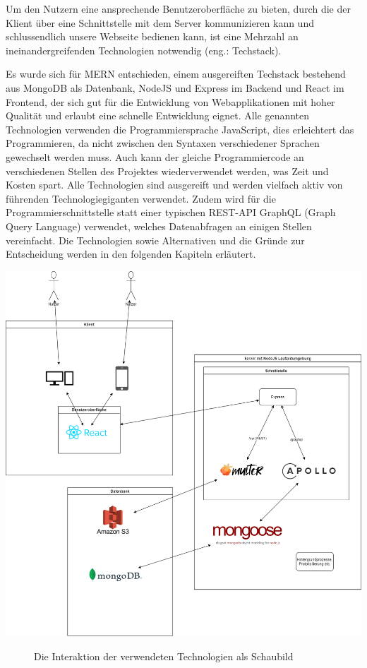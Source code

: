 Um den Nutzern eine ansprechende Benutzeroberfläche zu bieten, durch die der Klient über eine Schnittstelle mit dem Server kommunizieren kann und schlussendlich unsere Webseite bedienen kann, ist eine Mehrzahl an ineinandergreifenden Technologien notwendig (eng.: Techstack).

Es wurde sich für MERN entschieden, einem ausgereiften Techstack bestehend aus MongoDB als Datenbank, NodeJS und Express im Backend und React im Frontend, der sich gut für die Entwicklung von Webapplikationen mit hoher Qualität und erlaubt eine schnelle Entwicklung eignet. \cite{TI1}
Alle genannten Technologien verwenden die Programmiersprache JavaScript, dies erleichtert das Programmieren, da nicht zwischen den Syntaxen verschiedener Sprachen gewechselt werden muss. Auch kann der gleiche Programmiercode an verschiedenen Stellen des Projektes wiederverwendet werden, was Zeit und Kosten spart. Alle Technologien sind ausgereift und werden vielfach aktiv von führenden Technologiegiganten verwendet. Zudem wird für die Programmierschnittstelle statt einer typischen REST-API GraphQL (Graph Query Language) verwendet, welches Datenabfragen an einigen Stellen vereinfacht. Die Technologien sowie Alternativen und die Gründe zur Entscheidung werden in den folgenden Kapiteln erläutert.

\includegraphics[width=\textwidth]{sources/MERN-Stack_Schaubild.drawio}
\begin{figure}[ht]
	\centering
	\caption{Die Interaktion der verwendeten Technologien als Schaubild}
	\label{figMERN1}
\end{figure}

